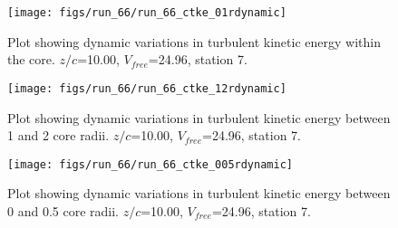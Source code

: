 \begin{figure}[H]
\centering
\texttt{[image: figs/run\_66/run\_66\_ctke\_01rdynamic]}
\caption{Plot showing dynamic variations in turbulent kinetic energy within the core. $z/c$=10.00, $V_{free}$=24.96, station 7.}
\end{figure}


\begin{figure}[H]
\centering
\texttt{[image: figs/run\_66/run\_66\_ctke\_12rdynamic]}
\caption{Plot showing dynamic variations in turbulent kinetic energy between 1 and 2 core radii. $z/c$=10.00, $V_{free}$=24.96, station 7.}
\end{figure}


\begin{figure}[H]
\centering
\texttt{[image: figs/run\_66/run\_66\_ctke\_005rdynamic]}
\caption{Plot showing dynamic variations in turbulent kinetic energy between 0 and 0.5 core radii. $z/c$=10.00, $V_{free}$=24.96, station 7.}
\end{figure}


